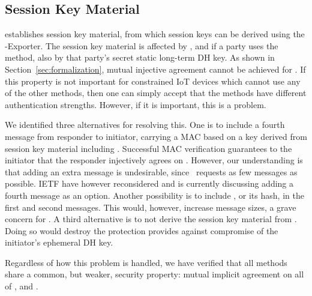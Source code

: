\documentclass[runningheads, envcountsame, hidelinks, a4paper, draft, x11names]{llncs}
\begin{document}
\subsection{Session Key Material}
\label{sec:sessionKeyMaterial}
\mEdhoc{} establishes session key material, from which session keys
can be derived using the \mEdhoc{}-Exporter.
%
The session key material is affected by \mGxy{}, and if a party uses the
\mStat{} method, also by that party's secret static long-term DH key.
%
As shown in Section~\ref{sec:formalization}, mutual injective agreement cannot
be achieved for \mGiy{}.
%
If this property is not important for constrained IoT devices which cannot use
any of the other methods, then one can simply accept that the methods have
different authentication strengths.
%
However, if it is important, this is a problem.
%

We identified three alternatives for resolving this.
%
One is to include a fourth message from responder to initiator,
carrying a MAC based on a key derived from session key
material including \mGiy{}.
%
Successful MAC verification guarantees
to the initiator that the responder injectively agrees on \mGiy{}.
%
However, our understanding is that adding an extra message is
undesirable, since~\cite{our-analysis-selander-lake-edhoc-01} requests as few messages as
possible.
%
IETF have however reconsidered and is currently discussing adding a fourth
message as an option.
%
Another possibility is to include \mGi{}, or its hash, in the first and
second messages.
%
This would, however, increase message sizes, a grave concern for \mEdhoc{}.
%
A third alternative is to not derive the session key material from \mGiy{}.
%
Doing so would destroy the protection \mOptls{} provides against compromise
of the initiator's ephemeral DH key.
%

Regardless of how this problem is handled, we have verified that all methods
share a common, but weaker, security property: mutual implicit agreement
on all of \mGxy{}, \mGiy{} and \mGrx{}.
%
\end{document}
